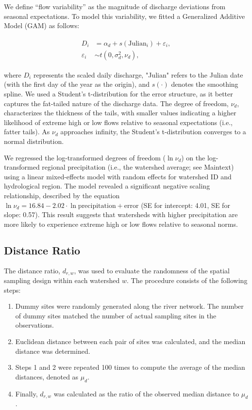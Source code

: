 \documentclass[11pt, class=article, crop=false]{standalone}
\begin{document}
We define ``flow variability'' as the magnitude of discharge deviations from seasonal expectations.
To model this variability, we fitted a Generalized Additive Model (GAM) as follows:

\begin{align}
    \begin{split}
    D_i &= \alpha_d + s(\text{Julian}_i) + \varepsilon_i,\\
    \varepsilon_i &\sim t(0, \sigma_d^2, \nu_d),
    \end{split}
\end{align}

where $D_i$ represents the scaled daily discharge, "Julian" refers to the Julian date (with the first day of the year as the origin), and $s(\cdot)$ denotes the smoothing spline.
We used a Student's t-distribution for the error structure, as it better captures the fat-tailed nature of the discharge data.
The degree of freedom, $\nu_d$, characterizes the thickness of the tails, with smaller values indicating a higher likelihood of extreme high or low flows relative to seasonal expectations (i.e., fatter tails).
As $\nu_d$ approaches infinity, the Student's t-distribution converges to a normal distribution.

We regressed the log-transformed degrees of freedom ($\ln \nu_d$) on the log-transformed regional precipitation (i.e., the watershed average; see Maintext) using a linear mixed-effects model with random effects for watershed ID and hydrological region.
The model revealed a significant negative scaling relationship, described by the equation $\ln \nu_d = 16.84 - 2.02 \cdot \ln \text{precipitation} + \text{error}$ (SE for intercept: 4.01, SE for slope: 0.57).
This result suggests that watersheds with higher precipitation are more likely to experience extreme high or low flows relative to seasonal norms.

\subsection{Distance Ratio}

The distance ratio, \(d_{r,w}\), was used to evaluate the randomness of the spatial sampling design within each watershed \(w\). The procedure consists of the following steps:

\begin{enumerate}
    \item Dummy sites were randomly generated along the river network. The number of dummy sites matched the number of actual sampling sites in the observations.
    \item Euclidean distance between each pair of sites was calculated, and the median distance was determined.
    \item Steps 1 and 2 were repeated 100 times to compute the average of the median distances, denoted as \(\mu_d\).
    \item Finally, \(d_{r,w}\) was calculated as the ratio of the observed median distance to \(\mu_d\).
\end{enumerate}
\end{document}
